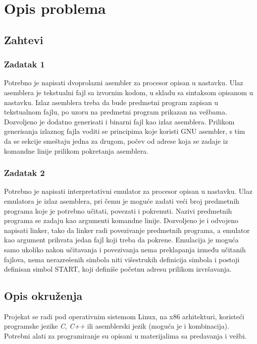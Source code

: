 \section{Opis problema}

\subsection{Zahtevi}

\subsubsection{Zadatak 1}
Potrebno je napisati dvoprolazni asembler za procesor opisan u nastavku. Ulaz
asemblera je tekstualni fajl sa izvornim kodom, u skladu sa sintaksom opisanom
u nastavku. Izlaz asemblera treba da bude predmetni program zapisan u
tekstualnom fajlu, po uzoru na predmetni program prikazan na vežbama.
Dozvoljeno je dodatno generisati i binarni fajl kao izlaz asemblera.
Prilikom generisanja izlaznog fajla voditi se principima koje koristi GNU
asembler, s tim da se sekcije smeštaju jedna za drugom, počev od adrese koja
se zadaje iz komandne linije prilikom pokretanja asemblera.

\subsubsection{Zadatak 2}
Potrebno je napisati interpretativni emulator za procesor opisan u nastavku.
Ulaz emulatora je izlaz asemblera, pri čemu je moguće zadati veći broj
predmetnih programa koje je potrebno učitati, povezati i pokrenuti. Nazivi
predmetnih programa se zadaju kao argumenti komandne linije. Dozvoljeno
je i odvojeno napisati linker, tako da linker radi povezivanje predmetnih
programa, a emulator kao argument prihvata jedan fajl koji treba da pokrene.
Emulacija je moguća samo ukoliko nakon učitavanja i povezivanja nema
preklapanja između učitanih fajlova, nema nerazrešenih simbola niti
višestru\-kih
definicija simbola i postoji definisan simbol START, koji definiše početnu
adresu prilikom izvršavanja.

\subsection{Opis okruženja}
Projekat se radi pod operativnim sistemom Linux, na x86 arhitekturi, koriste\-ći
programske jezike \textit{C}, \textit{C++} ili asemblerski jezik
(moguća je i kombinacija). Potrebni alati za programiranje su opisani u
materijalima sa predavanja i vežbi.


